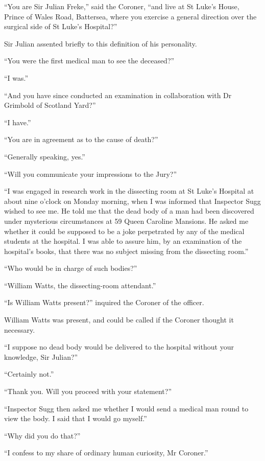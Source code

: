 \enquote{You are Sir Julian Freke,} said the Coroner, \enquote{and live at St Luke’s House, Prince of Wales Road, Battersea, where you exercise a general direction over the surgical side of St Luke’s Hospital?}

Sir Julian assented briefly to this definition of his personality.

\enquote{You were the first medical man to see the deceased?}

\enquote{I was.}

\enquote{And you have since conducted an examination in collaboration with Dr Grimbold of Scotland Yard?}

\enquote{I have.}

\enquote{You are in agreement as to the cause of death?}

\enquote{Generally speaking, yes.}

\enquote{Will you communicate your impressions to the Jury?}

\enquote{I was engaged in research work in the dissecting room at St Luke’s Hospital at about nine o’clock on Monday morning, when I was informed that Inspector Sugg wished to see me. He told me that the dead body of a man had been discovered under mysterious circumstances at 59 Queen Caroline Mansions. He asked me whether it could be supposed to be a joke perpetrated by any of the medical students at the hospital. I was able to assure him, by an examination of the hospital’s books, that there was no subject missing from the dissecting room.}

\enquote{Who would be in charge of such bodies?}

\enquote{William Watts, the dissecting-room attendant.}

\enquote{Is William Watts present?} inquired the Coroner of the officer.

William Watts was present, and could be called if the Coroner thought it necessary.

\enquote{I suppose no dead body would be delivered to the hospital without your knowledge, Sir Julian?}

\enquote{Certainly not.}

\enquote{Thank you. Will you proceed with your statement?}

\enquote{Inspector Sugg then asked me whether I would send a medical man round to view the body. I said that I would go myself.}

\enquote{Why did you do that?}

\enquote{I confess to my share of ordinary human curiosity, Mr Coroner.}

